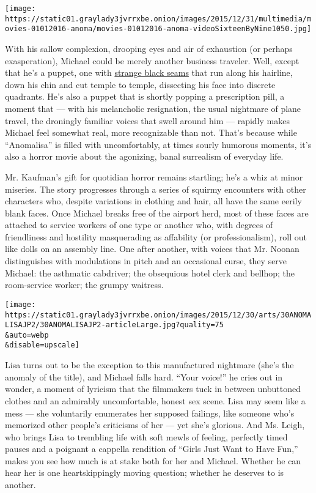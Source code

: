 \texttt{[image: https://static01.graylady3jvrrxbe.onion/images/2015/12/31/multimedia/movies-01012016-anoma/movies-01012016-anoma-videoSixteenByNine1050.jpg]}

With his sallow complexion, drooping eyes and air of exhaustion (or
perhaps exasperation), Michael could be merely another business
traveler. Well, except that he's a puppet, one with
\href{http://www.nytimes3xbfgragh.onion/interactive/2015/12/18/movies/anomalisa-behind-the-scenes.html}{strange
black seams} that run along his hairline, down his chin and cut temple
to temple, dissecting his face into discrete quadrants. He's also a
puppet that is shortly popping a prescription pill, a moment that ---
with his melancholic resignation, the usual nightmare of plane travel,
the droningly familiar voices that swell around him --- rapidly makes
Michael feel somewhat real, more recognizable than not. That's because
while ``Anomalisa'' is filled with uncomfortably, at times sourly
humorous moments, it's also a horror movie about the agonizing, banal
surrealism of everyday life.

Mr. Kaufman's gift for quotidian horror remains startling; he's a whiz
at minor miseries. The story progresses through a series of squirmy
encounters with other characters who, despite variations in clothing and
hair, all have the same eerily blank faces. Once Michael breaks free of
the airport herd, most of these faces are attached to service workers of
one type or another who, with degrees of friendliness and hostility
masquerading as affability (or professionalism), roll out like dolls on
an assembly line. One after another, with voices that Mr. Noonan
distinguishes with modulations in pitch and an occasional curse, they
serve Michael: the asthmatic cabdriver; the obsequious hotel clerk and
bellhop; the room-service worker; the grumpy waitress.

\texttt{[image: https://static01.graylady3jvrrxbe.onion/images/2015/12/30/arts/30ANOMALISAJP2/30ANOMALISAJP2-articleLarge.jpg?quality=75\\\&auto=webp\\\&disable=upscale]}

Lisa turns out to be the exception to this manufactured nightmare (she's
the anomaly of the title), and Michael falls hard. ``Your voice!'' he
cries out in wonder, a moment of lyricism that the filmmakers tuck in
between unbuttoned clothes and an admirably uncomfortable, honest sex
scene. Lisa may seem like a mess --- she voluntarily enumerates her
supposed failings, like someone who's memorized other people's
criticisms of her --- yet she's glorious. And Ms. Leigh, who brings Lisa
to trembling life with soft mewls of feeling, perfectly timed pauses and
a poignant a cappella rendition of ``Girls Just Want to Have Fun,''
makes you see how much is at stake both for her and Michael. Whether he
can hear her is one heartskippingly moving question; whether he deserves
to is another.


